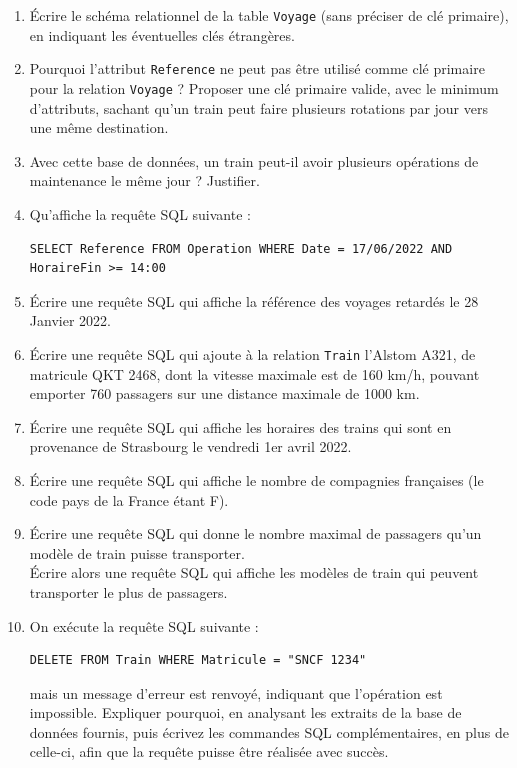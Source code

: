 \documentclass[11pt,a4paper,french,twoside]{PMCours}
\begin{document}
\begin{enumerate}
\item Écrire le schéma relationnel de la table \verb'Voyage' (sans préciser de clé primaire), en indiquant les éventuelles clés étrangères.
\item Pourquoi l'attribut \verb'Reference' ne peut pas être utilisé comme clé primaire pour la relation \verb'Voyage' ? Proposer une clé primaire valide, avec le minimum d'attributs, sachant qu'un train peut faire plusieurs rotations par jour vers une même destination.
\item Avec cette base de données, un train peut-il avoir plusieurs opérations de maintenance le même jour ? Justifier.
\item Qu'affiche la requête SQL suivante :
\begin{verbatim}
SELECT Reference FROM Operation WHERE Date = 17/06/2022 AND HoraireFin >= 14:00
\end{verbatim} 
\item Écrire une requête SQL qui affiche la référence des voyages retardés le 28 Janvier 2022.
\item Écrire une requête SQL qui ajoute à la relation \verb'Train' l'Alstom A321, de matricule QKT 2468, dont la vitesse maximale est de 160 km/h, pouvant emporter 760 passagers sur une distance maximale de 1000 km.
\item Écrire une requête SQL qui affiche les horaires des trains qui sont en provenance de Strasbourg le vendredi 1er avril 2022.
\item Écrire une requête SQL qui affiche le nombre de compagnies françaises (le code pays de la France étant F).
\item Écrire une requête SQL qui donne le nombre maximal de passagers qu'un modèle de train puisse transporter.\\
Écrire alors une requête SQL qui affiche les modèles de train qui peuvent transporter le plus de passagers.
\item On exécute la requête SQL suivante :
\begin{verbatim}
DELETE FROM Train WHERE Matricule = "SNCF 1234"
\end{verbatim} 
mais un message d'erreur est renvoyé, indiquant que l'opération est impossible. Expliquer pourquoi, en analysant les extraits de la base de données fournis, puis écrivez les commandes SQL complémentaires, en plus de celle-ci, afin que la requête puisse être réalisée avec succès.

\end{enumerate}
\end{document}
